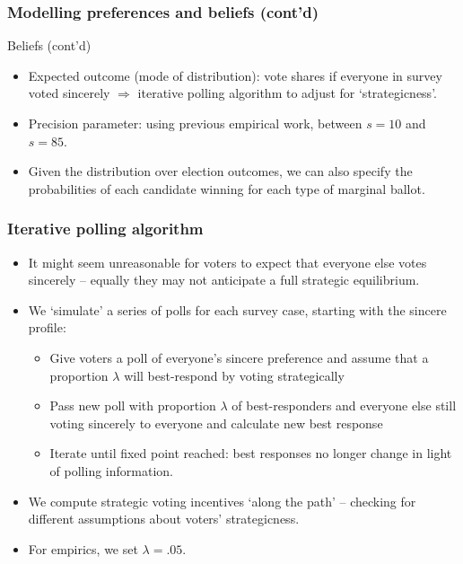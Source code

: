 \documentclass[10pt, en-GB]{beamer}
\begin{document}
\begin{frame}[t]\frametitle{Modelling preferences and beliefs (cont'd)}

\begin{block}{Beliefs (cont'd)}
\begin{itemize}
\item Expected outcome (mode of distribution): vote shares if everyone in survey voted sincerely $\Rightarrow$ iterative polling algorithm to adjust for `strategicness'.
\item Precision parameter: using previous empirical work, between $s = 10$ and $s = 85$. 
\item Given the distribution over election outcomes, we can also specify the probabilities of each candidate winning for each type of marginal ballot.
\end{itemize} 
\end{block}    
\end{frame}


\begin{frame}[t]\frametitle{Iterative polling algorithm}
    
\begin{itemize}[<+->]
	\item It might seem unreasonable for voters to expect that everyone else votes sincerely -- equally they may not anticipate a full strategic equilibrium.
	\item We `simulate' a series of polls for each survey case, starting with the sincere profile: 
		\begin{itemize}
			\item Give voters a poll of everyone's sincere preference and assume that a proportion $\lambda$ will best-respond by voting strategically
			\item Pass new poll with proportion $\lambda$ of best-responders and everyone else still voting sincerely to everyone and calculate new best response
			\item Iterate until fixed point reached: best responses no longer change in light of polling information.
		\end{itemize}
	\item We compute strategic voting incentives `along the path' -- checking for different assumptions about voters' strategicness.
	\item For empirics, we set $\lambda = .05$.
\end{itemize}

\end{frame}
\end{document}
